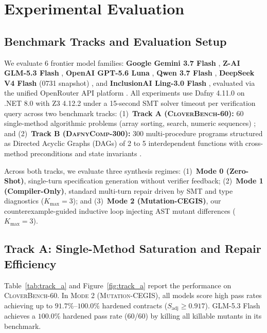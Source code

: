 \documentclass{article}
\begin{document}
\section{Experimental Evaluation}
\label{sec:experiments}

\subsection{Benchmark Tracks and Evaluation Setup}

We evaluate 6 frontier model families: \textbf{Google Gemini 3.7 Flash} \citep{gemini2026flash}, \textbf{Z-AI GLM-5.3 Flash} \citep{zai2026glm53}, \textbf{OpenAI GPT-5.6 Luna} \citep{openai2026gpt56}, \textbf{Qwen 3.7 Flash} \citep{qwen2026qwen37}, \textbf{DeepSeek V4 Flash} (0731 snapshot) \citep{deepseek2026v4}, and \textbf{InclusionAI Ling-3.0 Flash} \citep{inclusionai2026ling3}, evaluated via the unified OpenRouter API platform \citep{openrouter2026}. All experiments use Dafny 4.11.0 on .NET 8.0 with Z3 4.12.2 under a 15-second SMT solver timeout per verification query across two benchmark tracks: (1)~\textbf{Track A (\textsc{CloverBench-60}):} 60 single-method algorithmic problems (array sorting, search, numeric sequences) \citep{sun2024clover}; and (2)~\textbf{Track B (\textsc{DafnyComp-300}):} 300 multi-procedure programs structured as Directed Acyclic Graphs (DAGs) of 2 to 5 interdependent functions with cross-method preconditions and state invariants \citep{xu2025dafnycomp}.

Across both tracks, we evaluate three synthesis regimes: (1)~\textbf{Mode 0 (Zero-Shot)}, single-turn specification generation without verifier feedback; (2)~\textbf{Mode 1 (Compiler-Only)}, standard multi-turn repair driven by SMT and type diagnostics ($K_{\max}=3$); and (3)~\textbf{Mode 2 (Mutation-CEGIS)}, our counterexample-guided inductive loop injecting AST mutant differences ($K_{\max}=3$).

\subsection{Track A: Single-Method Saturation and Repair Efficiency}

Table~\ref{tab:track_a} and Figure~\ref{fig:track_a} report the performance on \textsc{CloverBench-60}. In \textsc{Mode 2} (\textsc{Mutation-CEGIS}), all models score high pass rates achieving up to $91.7\%\text{--}100.0\%$ hardened contracts ($S_{\text{adj}} \ge 0.917$). GLM-5.3 Flash achieves a $100.0\%$ hardened pass rate (60/60) by killing all killable mutants in its benchmark.
\end{document}
